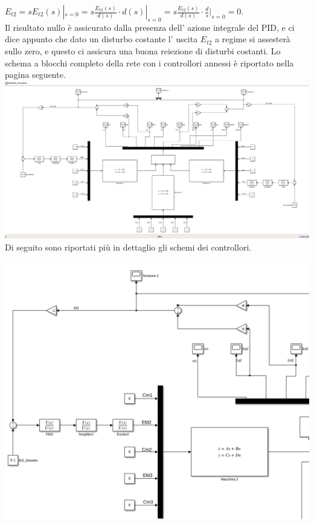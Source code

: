 \documentclass[Lau,noexaminfo]{sapthesis}
\begin{document}
	$E_{t2}=sE_{t2}(s)|_{s=0}=s\frac{E_{t2}(s)}{d(s)}\cdot d(s)|_{s=0}=s\frac{E_{t2}(s)}{d(s)}\cdot \frac{d}{s}|_{s=0}=0$.\\
	Il risultato nullo è assicurato dalla presenza dell' azione integrale del PID, e ci dice appunto che dato un disturbo costante l' uscita $E_{t2}$ a regime si assesterà sullo zero, e questo ci assicura una buona reiezione di disturbi costanti. 
	Lo schema a blocchi completo della rete con i controllori annessi è riportato nella pagina seguente.\\
	\includegraphics[scale=0.35,angle=-90]{Modello_controllato}\\
	Di seguito sono riportati più in dettaglio gli schemi dei controllori.\\\\
	\includegraphics[scale=0.5,angle=90]{Dettaglio_controllore2}\\
\end{document}
